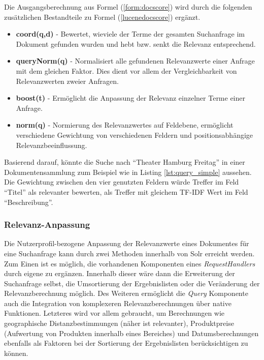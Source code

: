 Die Ausgangsberechnung aus Formel (\ref{form:docscore}) wird durch die folgenden zusätzlichen Bestandteile zu Formel (\ref{lucenedocscore}) ergänzt.

\begin{itemize}
\item \textbf{coord(q,d)} - Bewertet, wieviele der Terme der gesamten Suchanfrage im Dokument gefunden wurden und hebt bzw. senkt die Relevanz entsprechend.
\item \textbf{queryNorm(q)} - Normalisiert alle gefundenen Relevanzwerte einer Anfrage mit dem gleichen Faktor. Dies dient vor allem der Vergleichbarkeit von Relevanzwerten zweier Anfragen.
\item \textbf{boost(t)} - Ermöglicht die Anpassung der Relevanz einzelner Terme einer Anfrage.
\item \textbf{norm(q)} - Normierung des Relevanzwertes auf Feldebene, ermöglicht verschiedene Gewichtung von verschiedenen Feldern und positionsabhängige Relevanzbeeinflussung.
\end{itemize}

Basierend darauf, könnte die Suche nach ``Theater Hamburg Freitag'' in einer Dokumentensammlung zum Beispiel wie in Listing \ref{lst:query_simple} aussehen. Die Gewichtung zwischen den vier genutzten Feldern würde Treffer im Feld ``Titel'' als relevanter bewerten, als Treffer mit gleichem \acs{TF-IDF} Wert im Feld ``Beschreibung''. \citep{TFIDFSimilarity}



\subsubsection{Relevanz-Anpassung} \label{sec:solrsearchrelevance}

Die Nutzerprofil-bezogene Anpassung der Relevanzwerte eines Dokumentes für eine Suchanfrage kann durch zwei Methoden innerhalb von Solr erreicht werden. Zum Einen ist es möglich, die vorhandenen Komponenten eines \textit{RequestHandlers} durch eigene zu ergänzen. Innerhalb dieser wäre dann die Erweiterung der Suchanfrage selbst, die Umsortierung der Ergebnislisten oder die Veränderung der Relevanzberechnung möglich. Des Weiteren ermöglicht die \textit{Query} Komponente auch die Integration von komplexeren Relevanzberechnungen über native Funktionen. Letzteres wird vor allem gebraucht, um Berechnungen wie geographische Distanzbestimmungen (näher ist relevanter), Produktpreise (Aufwertung von Produkten innerhalb eines Bereiches) und Datumsberechnungen ebenfalls als Faktoren bei der Sortierung der Ergebnislisten berücksichtigen zu können.

